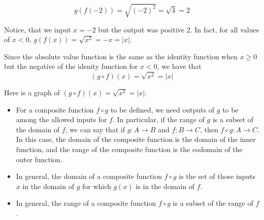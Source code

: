 \documentclass{ximera}
\begin{document}
\begin{example}
\begin{explanation}
\begin{enumerate}[label=\alph*.]
$$g(f(-2))=\sqrt{(-2)^2}=\sqrt{4}=2$$

Notice, that we input $x=-2$ but the output was positive 2.  In fact, for all values of $x<0$, $g(f(x))=\sqrt{x^2}=-x=|x|$.

Since the absolute value function is the same as the identity function when $x \geq 0$ but the negative of the idenity function for $x<0$, we have that 
$$(g \circ f)(x) =  \sqrt{x^2} = |x|$$

Here is a graph of $(g \circ f)(x) =  \sqrt{x^2} = |x|$.

\begin{image}
\end{image}
\end{enumerate}
\end{explanation}

\end{example}


\begin{summary}\begin{itemize}
\item For a composite function $f \circ g$ to be defined, we need outputs of \(g\) to be among the allowed inputs for \(f\).  In particular, if the range of $g$ is a subset of the domain of $f$, we can say that if \(g : A \to B\) and \(f : B \to C\), then \(f \circ g : A \to C\).  In this case, the domain of the composite function is the domain of the inner function, and the range of the composite function is the codomain of the outer function.
\item In general, the domain of a composite function $f \circ g$ is the set of those inputs $x$ in the domain of $g$ for which $g(x)$ is in the domain of $f$. 
\item In general, the range of a composite function $f \circ g$ is a subset of the range of $f$. 
\end{itemize}\end{summary}
\end{document}
